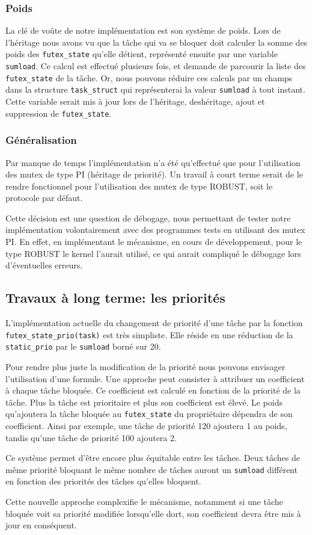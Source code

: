 \subsubsection{Poids}
La clé de voûte de notre implémentation est son système de poids.
Lors de l'héritage nous avons vu que la tâche qui va se bloquer doit calculer la somme
des poids des \verb|futex_state| qu'elle détient, représenté ensuite par une variable \verb|sumload|.
Ce calcul est effectué plusieurs fois, et demande de parcourir la liste des \verb|futex_state| de la tâche.
Or, nous pouvons réduire ces calculs par un champs dans la structure \verb|task_struct| qui représenterai
la valeur \verb|sumload| à tout instant. Cette variable serait mis à jour lors de l'héritage, deshéritage,
ajout et suppression de \verb|futex_state|.

\subsubsection{Généralisation}
Par manque de temps l'implémentation n'a été qu'effectué que pour l'utilisation des mutex de type PI 
(héritage de priorité). Un travail à court terme serait de le rendre
fonctionnel pour l'utilisation des mutex de type ROBUST, soit le protocole par défaut.

Cette décision est une question de débogage, nous permettant 
de tester notre implémentation volontairement avec des programmes tests en utilisant
des mutex PI. En effet, en implémentant le mécanisme, en cours de développement,
 pour le type ROBUST le kernel l'aurait utilisé, ce qui aurait compliqué le débogage lors d'éventuelles erreurs.

\subsection{Travaux à long terme: les priorités}
L'implémentation actuelle du changement de priorité d'une tâche par la fonction \verb|futex_state_prio(task)| 
est très simpliste. Elle réside en une réduction de la \verb|static_prio| par le \verb|sumload| 
borné sur 20.

Pour rendre plus juste la modification de la priorité nous pouvons envisager l'utilisation d'une formule.
Une approche peut consister à attribuer un coefficient à chaque tâche bloquée. 
Ce coefficient est calculé en fonction de la priorité de la tâche. 
Plus la tâche est prioritaire et plus son coefficient est élevé.
Le poids qu'ajoutera la tâche bloquée au \verb|futex_state| du propriétaire dépendra de son coefficient.
Ainsi par exemple, une tâche de priorité 120 ajoutera 1 au poids, tandis qu'une tâche de priorité 100
ajoutera 2. 

Ce système permet d'être encore plus équitable entre les tâches. Deux tâches de même priorité bloquant
le même nombre de tâches auront un \verb|sumload| différent en fonction des priorités des tâches qu'elles bloquent.

Cette nouvelle approche complexifie le mécanisme, notamment si une tâche bloquée voit sa priorité modifiée
lorsqu'elle dort, son coefficient devra être mis à jour en conséquent.


